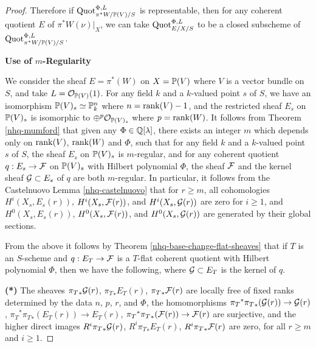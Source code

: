 \begin{proof}
Therefore if $\operatorname{Quot}_{\pi^*W/\mathbb{P}(V)/S}^{\Phi,L}$ is
representable, then for any coherent quotient
$E$ of $\pi^*W(\nu)|_X$, we can take $\operatorname{Quot}_{E/X/S}^{\Phi,L}$
to be a closed subscheme of $\operatorname{Quot}_{\pi^*W/\mathbb{P}(V)/S}^{\Phi,L}$.












\bigskip

\centerline{\large\bf Use of $m$-Regularity}

\medskip

We consider the sheaf $E = \pi^*(W)$ on $X=\mathbb{P}(V)$ where
$V$ is a vector bundle on $S$,
and take $L = {\mathcal O}_{\mathbb{P}(V)}(1)$.
For any field $k$ and a $k$-valued point
$s$ of $S$, we have an isomorphism
$\mathbb{P}(V)_s \simeq \mathbb{P}^n_k$ where $n=\operatorname{rank}(V)-1$,
and the restricted sheaf $E_s$ on $\mathbb{P}(V)_s$ is isomorphic to
$\oplus^p{\mathcal O}_{\mathbb{P}(V)_s}$ where $p=\operatorname{rank}(W)$.
It follows from Theorem \ref{nhq-mumford}
that given any $\Phi \in \mathbb{Q}[\lambda]$, there exists an integer
$m$ which depends only on $\operatorname{rank}(V)$, $\operatorname{rank}(W)$ and $\Phi$,
such that for any field $k$ and a $k$-valued point $s$ of $S$,
the sheaf $E_s$ on $\mathbb{P}(V)_s$ is $m$-regular, and for any
coherent quotient $q: E_s \to \mathcal{F}$ on $\mathbb{P}(V)_s$ with
Hilbert polynomial $\Phi$, the sheaf $\mathcal{F}$ and the kernel sheaf
$\mathcal{G}\subset E_s$ of $q$ are both $m$-regular.
In particular, it follows from the Castelnuovo Lemma \ref{nhq-castelnuovo}
that for $r\ge m$, all cohomologies
$H^i(X_s,E_s(r))$, $H^i(X_s,\mathcal{F}(r))$, and $H^i(X_s,\mathcal{G}(r))$
are zero for $i\ge 1$,
and $H^0(X_s,E_s(r))$, $H^0(X_s,\mathcal{F}(r))$, and $H^0(X_s,\mathcal{G}(r))$
are generated by their global sections.

From the above it follows by Theorem \ref{nhq-base-change-flat-sheaves}
that if $T$ is an $S$-scheme and
$q :E_T \to \mathcal{F}$ is a $T$-flat coherent quotient with Hilbert polynomial
$\Phi$, then we have the following, where $\mathcal{G}\subset E_T$ is
the kernel of $q$.

\textbf{(*) } The sheaves ${\pi_T}_*\mathcal{G}(r)$, ${\pi_T}_*E_T(r)$,
${\pi_T}_*\mathcal{F}(r)$ are locally free of fixed ranks
determined by the data $n$, $p$, $r$, and $\Phi$,
the homomorphisms ${\pi_T}^*{\pi_T}_*(\mathcal{G}(r))\to \mathcal{G}(r)$,
${\pi_T}^*{\pi_T}_*(E_T(r))\to E_T(r)$,
${\pi_T}^*{\pi_T}_*(\mathcal{F}(r))\to \mathcal{F}(r)$ are
surjective, and the higher direct images
$R^i{\pi_T}_*\mathcal{G}(r)$, $R^i{\pi_T}_*E_T(r)$,
$R^i{\pi_T}_*\mathcal{F}(r)$ are zero, for all $r\ge m$ and $i\ge 1$.


\end{proof}
